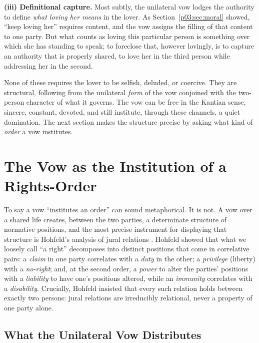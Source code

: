 \documentclass[11pt,a4paper]{article}
\begin{document}
\textbf{(iii) Definitional capture.} Most subtly, the unilateral vow lodges the authority to define \emph{what loving her means} in the lover. As Section~\ref{p03:sec:moral} showed, ``keep loving her'' requires content, and the vow assigns the filling of that content to one party. But what counts as loving this particular person is something over which she has standing to speak; to foreclose that, however lovingly, is to capture an authority that is properly shared, to love her in the third person while addressing her in the second.

None of these requires the lover to be selfish, deluded, or coercive. They are structural, following from the unilateral \emph{form} of the vow conjoined with the two-person character of what it governs. The vow can be free in the Kantian sense, sincere, constant, devoted, and still institute, through these channels, a quiet domination. The next section makes the structure precise by asking what kind of \emph{order} a vow institutes.

\section{The Vow as the Institution of a Rights-Order}\label{p03:sec:rights}

To say a vow ``institutes an order'' can sound metaphorical. It is not. A vow over a shared life creates, between the two parties, a determinate structure of normative positions, and the most precise instrument for displaying that structure is Hohfeld's analysis of jural relations \parencite{hohfeld1919fundamental}. Hohfeld showed that what we loosely call ``a right'' decomposes into distinct positions that come in correlative pairs: a \emph{claim} in one party correlates with a \emph{duty} in the other; a \emph{privilege} (liberty) with a \emph{no-right}; and, at the second order, a \emph{power} to alter the parties' positions with a \emph{liability} to have one's positions altered, while an \emph{immunity} correlates with a \emph{disability}. Crucially, Hohfeld insisted that every such relation holds between exactly two persons: jural relations are irreducibly relational, never a property of one party alone.

\subsection{What the Unilateral Vow Distributes}
\end{document}
